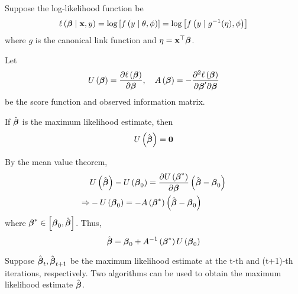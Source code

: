 Suppose the log-likelihood function be
\begin{equation}
	\ell\left(\boldsymbol{\beta}\mid\mathbf{x},y\right)=\log\left[f\left(y\mid\theta,\phi\right)\right]=\log\left[f\left(y\mid g^{-1}(\eta),\phi\right)\right]
\end{equation}
where \(g\) is the canonical link function and \(\eta=\mathbf{x}^{\top}\boldsymbol{\beta}\).

Let
\begin{equation*}
	U\left(\boldsymbol{\beta}\right)=\frac{\partial\ell\left(\boldsymbol{\beta}\right)}{\partial\boldsymbol{\beta}},\quad A\left(\boldsymbol{\beta}\right)=-\frac{\partial^{2}\ell\left(\boldsymbol{\beta}\right)}{\partial\boldsymbol{\beta}^{\prime}\partial\boldsymbol{\beta}}
\end{equation*}
be the score function and observed information matrix.

If \(\hat{\boldsymbol{\beta}}\) is the maximum likelihood estimate, then
\begin{equation*}
	U\left(\hat{\boldsymbol{\beta}}\right)=\mathbf{0}
\end{equation*}

By the mean value theorem,
\begin{equation*}
	\begin{aligned}
		            & U\left(\hat{\boldsymbol{\beta}}\right)-U\left(\boldsymbol{\beta}_{0}\right)=\frac{\partial U\left(\boldsymbol{\beta}^{*}\right)}{\partial\boldsymbol{\beta}}\left(\hat{\boldsymbol{\beta}}-\boldsymbol{\beta}_{0}\right) \\
		\Rightarrow & -U\left(\boldsymbol{\beta}_{0}\right)=-A\left(\boldsymbol{\beta}^{*}\right)\left(\hat{\boldsymbol{\beta}}-\boldsymbol{\beta}_{0}\right)
	\end{aligned}
\end{equation*}
where \(\boldsymbol{\beta}^{*}\in\left[\boldsymbol{\beta}_{0},\hat{\boldsymbol{\beta}}\right]\). Thus,
\begin{equation*}
	\hat{\boldsymbol{\beta}}=\boldsymbol{\beta}_{0}+A^{-1}\left(\boldsymbol{\beta}^{*}\right)U\left(\boldsymbol{\beta}_{0}\right)
\end{equation*}

Suppose \(\hat{\boldsymbol{\beta}}_{t},\hat{\boldsymbol{\beta}}_{t+1}\) be the maximum likelihood estimate at the t-th and (t+1)-th iterations, respectively. Two algorithms can be used to obtain the maximum likelihood estimate \(\hat{\boldsymbol{\beta}}\).

